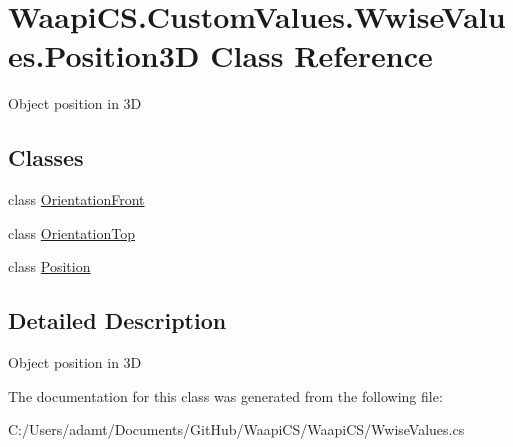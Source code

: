 \hypertarget{class_waapi_c_s_1_1_custom_values_1_1_wwise_values_1_1_position3_d}{}\section{Waapi\+C\+S.\+Custom\+Values.\+Wwise\+Values.\+Position3D Class Reference}
\label{class_waapi_c_s_1_1_custom_values_1_1_wwise_values_1_1_position3_d}


Object position in 3D  


\subsection*{Classes}
\begin{DoxyCompactItemize}
\item 
class \mbox{\hyperlink{class_waapi_c_s_1_1_custom_values_1_1_wwise_values_1_1_position3_d_1_1_orientation_front}{Orientation\+Front}}
\item 
class \mbox{\hyperlink{class_waapi_c_s_1_1_custom_values_1_1_wwise_values_1_1_position3_d_1_1_orientation_top}{Orientation\+Top}}
\item 
class \mbox{\hyperlink{class_waapi_c_s_1_1_custom_values_1_1_wwise_values_1_1_position3_d_1_1_position}{Position}}
\end{DoxyCompactItemize}


\subsection{Detailed Description}
Object position in 3D 



The documentation for this class was generated from the following file\+:\begin{DoxyCompactItemize}
\item 
C\+:/\+Users/adamt/\+Documents/\+Git\+Hub/\+Waapi\+C\+S/\+Waapi\+C\+S/Wwise\+Values.\+cs\end{DoxyCompactItemize}
